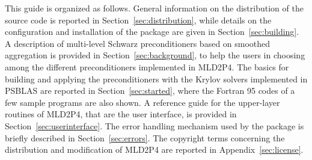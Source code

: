 This guide is organized as follows. General information on the distribution of the source code
is reported in Section~\ref{sec:distribution}, while details on the configuration
and installation of the package are given in Section~\ref{sec:building}. A description of
multi-level Schwarz preconditioners based on smoothed aggregation is provided
in Section~\ref{sec:background}, to help the users in choosing among the different preconditioners
implemented in MLD2P4. The basics for building and applying the preconditioners
with the Krylov solvers implemented in PSBLAS are reported in Section~\ref{sec:started}, where the
Fortran 95 codes of a few sample programs are also shown. A reference guide for
the upper-layer routines of MLD2P4, that are the user interface, is provided
in Section~\ref{sec:userinterface}. The error handling mechanism used by the package is briefly described
in Section~\ref{sec:errors}. The copyright terms concerning the distribution and modification
of MLD2P4 are reported in Appendix~\ref{sec:license}.

